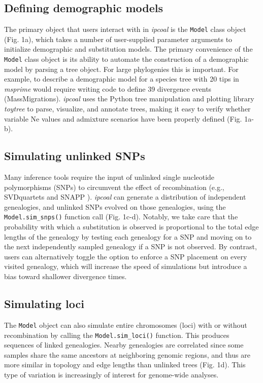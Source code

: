 \documentclass[11pt]{article}
\begin{document}
\subsection{Defining demographic models}
The primary object that users interact with in \emph{ipcoal} is the \texttt{Model} class object (Fig. 1a), which takes a number of user-supplied parameter arguments to initialize demographic and substitution models. The primary convenience of the \texttt{Model} class object is its ability to automate the construction of a demographic model by parsing a tree object. For large phylogenies this is important. For example, to describe a demographic model for a species tree with 20 tips in \emph{msprime} would require writing code to define 39 divergence events (MassMigrations). \emph{ipcoal} uses the Python tree manipulation and plotting library \emph{toytree} \citep{eaton_toytree_2020} to parse, visualize, and annotate trees, making it easy to verify whether variable Ne values and admixture scenarios have been properly defined (Fig. 1a-b). 

\subsection{Simulating unlinked SNPs}
Many inference tools require the input of unlinked single nucleotide polymorphisms (SNPs) to circumvent the effect of recombination (e.g., SVDquartets \citep{chifman_quartets_2014} and SNAPP \citep{bryant_snapp_2012}). \emph{ipcoal} can generate a distribution of independent genealogies, and unlinked SNPs evolved on those genealogies, using the \texttt{Model.sim\_snps()} function call (Fig. 1c-d). Notably, we take care that the probability with which a substitution is observed is proportional to the total edge lengths of the genealogy by testing each genealogy for a SNP and moving on to the next independently sampled genealogy if a SNP is not observed. By contrast, users can alternatively toggle the option to enforce a SNP placement on every visited genealogy, which will increase the speed of simulations but introduce a bias toward shallower divergence times. 

\subsection{Simulating loci}
The \texttt{Model} object can also simulate entire chromosomes (loci) with or without recombination by calling the \texttt{Model.sim\_loci()} function. This produces sequences of linked genealogies. Nearby genealogies are correlated since some samples share the same ancestors at neighboring genomic regions, and thus are more similar in topology and edge lengths than unlinked trees (Fig. 1d). This type of variation is increasingly of interest for genome-wide analyses.
\end{document}
